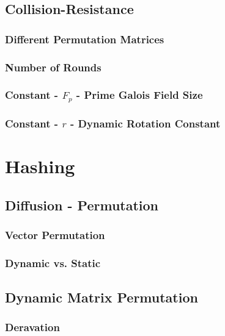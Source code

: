 \documentclass[fleqn, a4paper,12pt]{article}
\begin{document}
\subsection{Collision-Resistance}

\subsubsection{Different Permutation Matrices}

\subsubsection{Number of Rounds}

\subsubsection{Constant - $F_p$ - Prime Galois Field Size} %

\subsubsection{Constant - $r$ - Dynamic Rotation Constant} %

\section{Hashing}



\subsection{Diffusion - Permutation}


\subsubsection{Vector Permutation}


\subsubsection{Dynamic vs. Static}

\subsection{Dynamic Matrix Permutation}



\subsubsection{Deravation}
\end{document}
